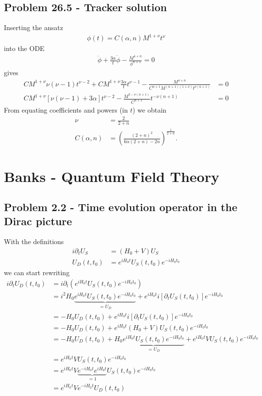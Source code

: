 \documentclass[10pt,a4paper]{book}
\theoremstyle{definition}
\begin{document}
\subsection{Problem 26.5 - Tracker solution}
Inserting the ansatz
\begin{align}
    \phi(t)=C(\alpha,n)M^{1+\nu}t^\nu
\end{align}
into the ODE
\begin{align}
    \ddot\phi+\frac{3\alpha}{t}\dot\phi-\frac{M^{4+n}}{\phi^{n+1}}=0
\end{align}
gives
\begin{align}
    CM^{1+\nu}\nu(\nu-1)t^{\nu-2}+CM^{1+\nu}\frac{3\alpha}{t}t^{\nu-1}-\frac{M^{4+n}}{C^{n+1}M^{(n+1)(1+\nu)}t^{\nu(n+1)}}&=0\\
    CM^{1+\nu}\left[\nu(\nu-1)+3\alpha\right]t^{\nu-2}-\frac{M^{3-\nu(n+1)}}{C^{n+1}}t^{-\nu(n+1)}&=0
\end{align}
From equating coefficients and powers (in $t$) we obtain
\begin{align}
    \nu&=\frac{2}{2+n}\\
    C(\alpha,n)&=\left(\frac{(2+n)^2}{6\alpha(2+n)-2n}\right)^\frac{1}{2+n}.
\end{align}

\newpage
\section{{\sc Banks} - Quantum Field Theory}
\subsection{Problem 2.2 - Time evolution operator in the Dirac picture}
With the definitions
\begin{align}
i\partial_tU_S&=(H_0+V)U_S\\
U_D(t,t_0)&=e^{iH_0t}U_S(t,t_0)e^{-iH_0t_0}
\end{align}
we can start rewriting
\begin{align}
i\partial_t U_D(t,t_0)
&=i\partial_t \left(e^{iH_0t}U_S(t,t_0)e^{-iH_0t_0}\right)\\
&=i^2H_0\underbrace{e^{iH_0t}U_S(t,t_0)e^{-iH_0t_0}}_{=U_D}+e^{iH_0t}i[\partial_tU_S(t,t_0)]e^{-iH_0t_0}\\
&=-H_0 U_D(t,t_0)+e^{iH_0t}i[\partial_tU_S(t,t_0)]e^{-iH_0t_0}\\
&=-H_0 U_D(t,t_0)+e^{iH_0t}(H_0+V)U_S(t,t_0)e^{-iH_0t_0}\\
&=-H_0 U_D(t,t_0)+H_0\underbrace{e^{iH_0t}U_S(t,t_0)e^{-iH_0t_0}}_{=U_D}+e^{iH_0t}VU_S(t,t_0)e^{-iH_0t_0}\\
&=e^{iH_0t}VU_S(t,t_0)e^{-iH_0t_0}\\
&=e^{iH_0t}V\underbrace{e^{-iH_0t}e^{iH_0t}}_{=1}U_S(t,t_0)e^{-iH_0t_0}\\
&=e^{iH_0t}Ve^{-iH_0t}U_D(t,t_0)
\end{align}
\end{document}
